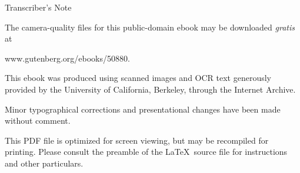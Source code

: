 \documentclass[oneside,12pt]{book}
\newcommand{\iit}[1]{\textit{#1}}
\begin{document}
    
\frontmatter

\vspace*{1cm}
\vfill
\begin{center}
    Transcriber's Note
\end{center}
\noindent The camera-quality files for this public-domain ebook may be downloaded \iit{gratis} at 
\begin{center}
    www.gutenberg.org/ebooks/50880.
\end{center} \par 

\noindent This ebook was produced using scanned images and OCR text generously provided by the University of California, Berkeley, through the Internet Archive. \par 

\noindent Minor typographical corrections and presentational changes have been made without comment. \par 

\noindent This PDF file is optimized for screen viewing, but may be recompiled for printing. Please consult the preamble of the \LaTeX\ source file for instructions and other particulars. \par 

\pagebreak

\end{document}

